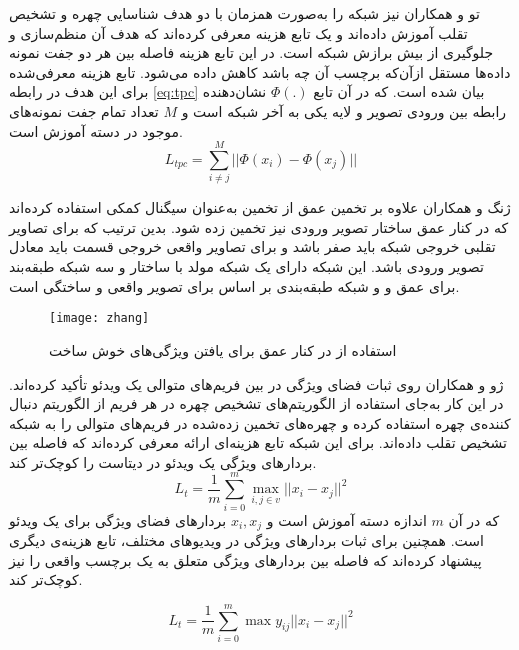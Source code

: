 تو و همکاران
\cite{tu2020learning}
 نیز شبکه  را به‌صورت همزمان با دو هدف شناسایی چهره و تشخیص تقلب آموزش داده‌اند و یک تابع هزینه معرفی کرده‌اند که هدف آن منظم‌سازی
  و جلوگیری از بیش برازش شبکه است. در این تابع هزینه فاصله بین هر دو جفت نمونه داده‌ها مستقل از‌آن‌که برچسب آن چه باشد کاهش داده می‌شود. تابع هزینه معرفی‌شده برای این هدف در رابطه
\ref{eq:tpc}
 بیان شده است. که در آن تابع 
 $\Phi(.)$
  نشان‌دهنده رابطه بین ورودی تصویر و لایه یکی به آخر شبکه است و $M$ تعداد تمام جفت نمونه‌های موجود در دسته آموزش است. 
  \begin{equation}\label{eq:tpc}
 	L_{tpc}=\sum_{i\ne j}^{M}||\Phi(x_i)-\Phi(x_j)||
 \end{equation}

ژنگ و همکاران
\cite{zhang2020face}
علاوه بر تخمین عمق از تخمین  به‌عنوان سیگنال کمکی استفاده کرده‌اند که در کنار عمق ساختار  تصویر ورودی نیز تخمین زده شود. بدین ترتیب که برای تصاویر تقلبی خروجی  شبکه باید صفر باشد و برای تصاویر واقعی خروجی قسمت  باید معادل  تصویر ورودی باشد. این شبکه دارای یک شبکه مولد با ساختار  و سه شبکه طبقه‌بند برای عمق و  و شبکه طبقه‌بندی بر اساس  برای تصویر واقعی و ساختگی است.
 \begin{figure}[h]
	\centerline{\texttt{[image: zhang]}}
	\caption{استفاده از  در کنار عمق برای یافتن ویژگی‌های خوش ساخت \cite{zhang2020face} }
	\label{fig:zhang}
\end{figure}

ژو و همکاران
\cite{xu2021improving}
روی ثبات فضای ویژگی در بین فریم‌های متوالی یک ویدئو تأکید کرده‌اند. در این کار به‌جای استفاده از الگوریتم‌های تشخیص چهره در هر فریم از الگوریتم دنبال کننده‌ی چهره استفاده کرده و چهره‌های تخمین زده‌شده در فریم‌های متوالی را به شبکه تشخیص تقلب داده‌اند. برای این شبکه تابع هزینه‌ای ارائه معرفی کرده‌اند که فاصله بین بردارهای ویژگی یک ویدئو در دیتاست را کوچک‌تر کند. 
  \begin{equation}\label{eq:xult}
	L_{t}=\frac{1}{m}\sum_{i=0}^{m}\max_{i,j \in v}{||x_i-x_j||^2}
\end{equation}
که در آن 
$m$
 اندازه دسته آموزش است و
$x_i,x_j$
بردارهای فضای ویژگی برای یک ویدئو است. همچنین برای ثبات بردارهای ویژگی در ویدیوهای مختلف، تابع هزینه‌ی دیگری پیشنهاد کرده‌اند که فاصله بین بردارهای ویژگی متعلق به یک برچسب واقعی را نیز کوچک‌تر کند.

  \begin{equation}\label{eq:xule}
	L_{t}=\frac{1}{m}\sum_{i=0}^{m}\max{y_{ij}||x_i-x_j||^2}
\end{equation}

